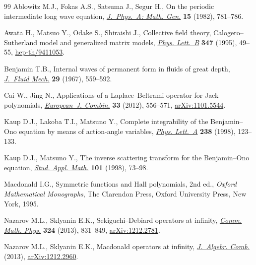 \documentclass[11pt]{article}
\numberwithin{equation}{section}
\begin{document}
\begin{thebibliography}{99}
Ablowitz M.J., Fokas A.S., Satsuma J., Segur H., On the periodic intermediate
  long wave equation, \href{http://dx.doi.org/10.1088/0305-4470/15/3/017}{\textit{J.~Phys.~A: Math. Gen.}} \textbf{15} (1982),
  781--786.

Awata H., Matsuo Y., Odake S., Shiraishi J., Collective f\/ield theory,
  {C}alogero--{S}utherland model and ge\-neralized matrix models, \href{http://dx.doi.org/10.1016/0370-2693(95)00055-P}{\textit{Phys.
  Lett.~B}} \textbf{347} (1995), 49--55, \href{http://arxiv.org/abs/hep-th/9411053}{hep-th/9411053}.

Benjamin T.B., Internal waves of permanent form in f\/luids of great depth,
  \href{http://dx.doi.org/10.1017/S002211206700103X}{\textit{J.~Fluid Mech.}} \textbf{29} (1967), 559--592.

Cai W., Jing N., Applications of a {L}aplace--{B}eltrami operator for {J}ack
  polynomials, \href{http://dx.doi.org/10.1016/j.ejc.2011.11.003}{\textit{European~J. Combin.}} \textbf{33} (2012), 556--571,
  \href{http://arxiv.org/abs/1101.5544}{arXiv:1101.5544}.

Kaup D.J., Lakoba T.I., Matsuno Y., Complete integrability of the
  {B}enjamin--{O}no equation by means of action-angle variables, \href{http://dx.doi.org/10.1016/S0375-9601(97)00712-3}{\textit{Phys.
  Lett.~A}} \textbf{238} (1998), 123--133.

Kaup D.J., Matsuno Y., The inverse scattering transform for the
  {B}enjamin--{O}no equation, \href{http://dx.doi.org/10.1111/1467-9590.00086}{\textit{Stud. Appl. Math.}} \textbf{101} (1998),
  73--98.

Macdonald I.G., Symmetric functions and {H}all polynomials, 2nd ed., \textit{Oxford
  Mathematical Monographs}, The Clarendon Press, Oxford University Press, New
  York, 1995.


Nazarov M.L., Sklyanin E.K., Sekiguchi--{D}ebiard operators at inf\/inity,
  \href{http://dx.doi.org/10.1007/s00220-013-1821-z}{\textit{Comm. Math. Phys.}} \textbf{324} (2013), 831--849, \href{http://arxiv.org/abs/1212.2781}{arXiv:1212.2781}.

Nazarov M.L., Sklyanin E.K., Macdonald operators at inf\/inity,
  \href{http://dx.doi.org/10.1007/s10801-013-0477-2}{\textit{J.~Algebr. Comb.}} (2013), \href{http://arxiv.org/abs/1212.2960}{arXiv:1212.2960}.


\end{thebibliography}
\end{document}
